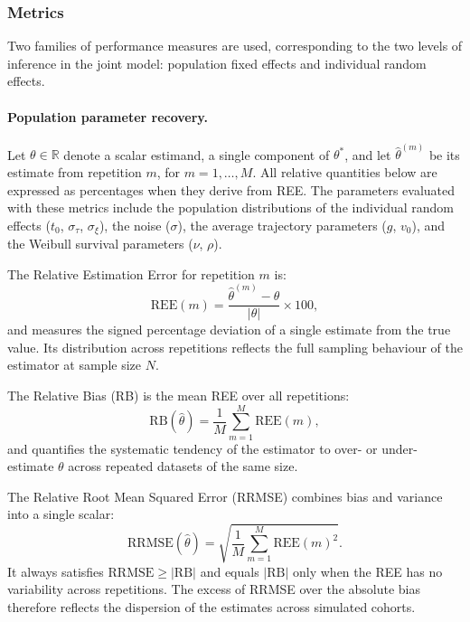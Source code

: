 \documentclass{rapportCS}
\begin{document}
\subsubsection{Metrics}
\label{sec:metrics}

Two families of performance measures are used, corresponding to the two levels of inference in the joint model: population fixed effects and individual random effects.

\paragraph{Population parameter recovery.}
Let $\theta \in \mathbb{R}$ denote a scalar estimand, a single component of $\theta^{*}$, and let $\hat{\theta}^{(m)}$ be its estimate from repetition $m$, for $m = 1, \ldots, M$. All relative quantities below are expressed as percentages when they derive from REE. The parameters evaluated with these metrics include the population distributions of the individual random effects ($t_0$, $\sigma_\tau$, $\sigma_\xi$), the noise ($\sigma$), the average trajectory  parameters ($g$, $v_0$), and the Weibull survival parameters ($\nu$, $\rho$). 

The {Relative Estimation Error} for repetition $m$ is:
\begin{equation}
  \mathrm{REE}(m) = \frac{\hat{\theta}^{(m)} - \theta}{|\theta|} \times 100,
\end{equation}
and measures the signed percentage deviation of a single estimate from the true value. Its distribution across repetitions reflects the full sampling behaviour of the estimator at sample size $N$.

The {Relative Bias} (RB) is the mean REE over all repetitions:
\begin{equation}
  \mathrm{RB}(\hat{\theta}) = \frac{1}{M}\sum_{m=1}^{M} \mathrm{REE}(m),
\end{equation}
and quantifies the systematic tendency of the estimator to over- or under-estimate $\theta$ across repeated datasets of the same size.

The {Relative Root Mean Squared Error} (RRMSE) combines bias and variance into a single scalar:
\begin{equation}
  \mathrm{RRMSE}(\hat{\theta}) = \sqrt{\frac{1}{M}\sum_{m=1}^{M} \mathrm{REE}(m)^2}.
\end{equation}
It always satisfies $\mathrm{RRMSE} \geq |\mathrm{RB}|$ and equals $|\mathrm{RB}|$ only when the REE has no variability across repetitions. The excess of RRMSE over the absolute bias therefore reflects the dispersion of the estimates across simulated cohorts.
\end{document}
